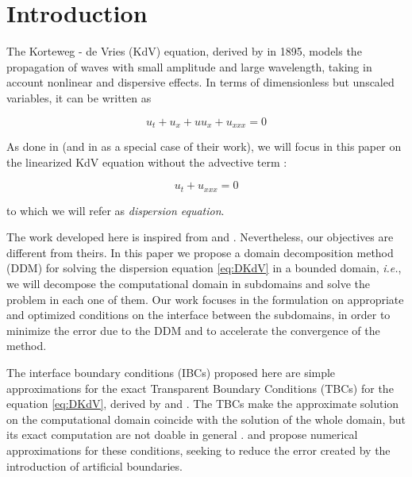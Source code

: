 \section{Introduction}

\indent The Korteweg - de Vries (KdV) equation, derived by \cite{kdv1895} in 1895, models the propagation of waves with small amplitude and large wavelength, taking in account nonlinear and dispersive effects. In terms of dimensionless but unscaled variables, it can be written as \cite{BBM1971}

\begin{equation*}
	u_t + u_x + uu_x + u_{xxx} = 0
\end{equation*}

\indent As done in \cite{zheng2008} (and in \cite{besse2015} as a special case of their work), we will focus in this paper on the linearized KdV equation without the advective term : 

\begin{equation}
 \label{eq:DKdV}
	u_t  + u_{xxx} = 0
\end{equation}

\noindent to which we will refer as \emph{dispersion equation}.

\indent The work developed here is inspired from \cite{zheng2008} and \cite{besse2015}. Nevertheless, our objectives are different from theirs. In this paper we propose a domain decomposition method (DDM) for solving the dispersion equation \eqref{eq:DKdV} in a bounded domain, \emph{i.e.}, we will decompose the computational domain in subdomains and solve the problem in each one of them. Our work focuses in the formulation on appropriate and optimized conditions on the interface between the subdomains, in order to minimize the error due to the DDM and to accelerate the convergence of the method.

\indent The interface boundary conditions (IBCs) proposed here are simple approximations for the exact Transparent Boundary Conditions (TBCs) for the equation \eqref{eq:DKdV}, derived by \cite{zheng2008} and \cite{besse2015}. The TBCs make the approximate solution on the computational domain coincide with the solution of the whole domain, but its exact computation are not doable in general \cite{Xavieretal2008}. \cite{zheng2008} and \cite{besse2015} propose numerical approximations for these conditions, seeking to reduce the error created by the introduction of artificial boundaries.

